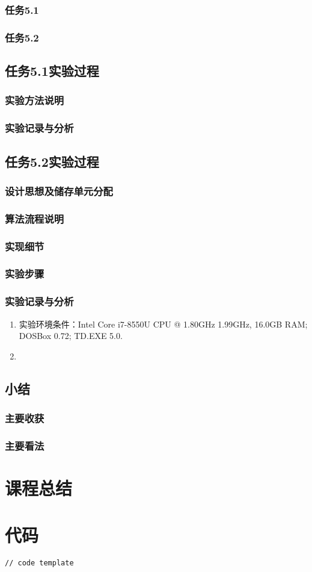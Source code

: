\documentclass{ctexrep}
\begin{document}
\subsection{任务5.1}
\subsection{任务5.2}
\section{任务5.1实验过程}
\subsection{实验方法说明}
\subsection{实验记录与分析}
\section{任务5.2实验过程}
\subsection{设计思想及储存单元分配}
\subsection{算法流程说明}
\subsection{实现细节}
\subsection{实验步骤}
\subsection{实验记录与分析}
\begin{enumerate}
    \item 实验环境条件：Intel Core i7-8550U CPU @ 1.80GHz 1.99GHz, 16.0GB RAM; DOSBox 0.72; TD.EXE 5.0.
    \item 
\end{enumerate}
\section{小结}
\subsection{主要收获}
\subsection{主要看法}


\chapter{课程总结}



\appendix
\chapter{代码}
\begin{lstlisting}[language={[x86masm]Assembler}]
    // code template
\end{lstlisting}    

    
\end{document}
